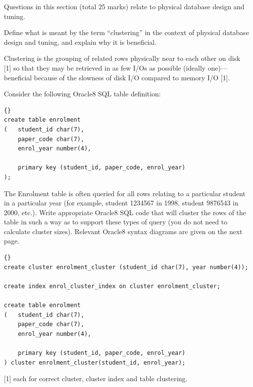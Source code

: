 \begin{examsection}{25}{}{Questions in this section (total 25 marks) relate to
physical database design and tuning.}
\begin{question}{5}\label{clusterq}


	\begin{subquestion}{2}
		Define what is meant by the term ``clustering'' in the context of
		physical database design and tuning, and explain why it is beneficial.
		\begin{marking}
			Clustering is the grouping of related rows physically near to each
			other on disk [1] so that they may be retrieved in as few I/Os as
			possible (ideally one)---beneficial because of the slowness of disk
			I/O compared to memory I/O [1].
		\end{marking}
	\end{subquestion}
	

	\begin{subquestion}{3}\label{clusterqcode}
		Consider the following Oracle8 SQL table definition:
		
		\begin{lstlisting}[language={[Oracle8]SQL}]{}
create table enrolment
(	student_id char(7),
	paper_code char(7),
	enrol_year number(4),
  
	primary key (student_id, paper_code, enrol_year)
);
		\end{lstlisting}

		The \textsf{Enrolment} table is often queried for all rows relating to
		a particular student in a particular year (for example, student 1234567
		in 1998, student 9876543 in 2000, etc.). Write appropriate Oracle8 SQL
		code that will cluster the rows of the table in such a way as to
		support these types of query (you do not need to calculate cluster
		sizes). Relevant Oracle8 syntax diagrams are given on the next page.
		\begin{marking}
			\begin{lstlisting}[language={[Oracle8]SQL}]{}
create cluster enrolment_cluster (student_id char(7), year number(4));

create index enrol_cluster_index on cluster enrolment_cluster;

create table enrolment
(	student_id char(7),
	paper_code char(7),
	enrol_year number(4),
  
	primary key (student_id, paper_code, enrol_year)
) cluster enrolment_cluster(student_id, enrol_year);
			\end{lstlisting}
		\end{marking}
		[1] each for correct cluster, cluster index and table clustering.
	\end{subquestion}

\end{question}


\end{examsection}


